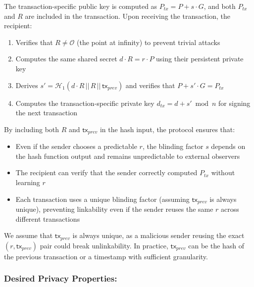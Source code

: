 \documentclass{article}
\begin{document}
The transaction-specific public key is computed as $P_{tx} = P + s \cdot G$, and both $P_{tx}$ and $R$ are included in the transaction. Upon receiving the transaction, the recipient:
\begin{enumerate}
\item Verifies that $R \neq \mathcal{O}$ (the point at infinity) to prevent trivial attacks
\item Computes the same shared secret $d \cdot R = r \cdot P$ using their persistent private key
\item Derives $s' = \mathcal{H}_1(d \cdot R \,||\, R \,||\, \mathsf{tx}_{prev})$ and verifies that $P + s' \cdot G = P_{tx}$
\item Computes the transaction-specific private key $d_{tx} = d + s' \bmod n$ for signing the next transaction
\end{enumerate}

By including both $R$ and $\mathsf{tx}_{prev}$ in the hash input, the protocol ensures that:
\begin{itemize}
\item Even if the sender chooses a predictable $r$, the blinding factor $s$ depends on the hash function output and remains unpredictable to external observers
\item The recipient can verify that the sender correctly computed $P_{tx}$ without learning $r$
\item Each transaction uses a unique blinding factor (assuming $\mathsf{tx}_{prev}$ is always unique), preventing linkability even if the sender reuses the same $r$ across different transactions
\end{itemize}

We assume that $\mathsf{tx}_{prev}$ is always unique, as a malicious sender reusing the exact $(r, \mathsf{tx}_{prev})$ pair could break unlinkability. In practice, $\mathsf{tx}_{prev}$ can be the hash of the previous transaction or a timestamp with sufficient granularity.


\subsubsection{Desired Privacy Properties:}
\end{document}
